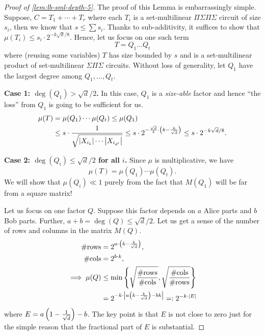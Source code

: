 \begin{proof}[Proof of \autoref{lem:lb-sml-depth-5}] The proof of this Lemma is embarrassingly simple. Suppose, $C = T_1 +  \cdots + T_r$ where each $T_i$ is a set-multilinear $\Pi\Sigma\Pi\Sigma$ circuit of size $s_i$, then we know that $s \leq \sum s_i$. Thanks to sub-additivity, it suffices to show that $\mu(T_i) \leq s_i \cdot 2^{-k\sqrt{d}/8}$. Hence, let us focus on one such term
  \[
    T = Q_1 \ldots Q_t
  \]
  where (reusing some variables) $T$ has size bounded by $s$ and is a set-multilinear product of set-multilinear $\Sigma\Pi\Sigma$ circuits. Without loss of generality, let $Q_1$ have the largest degree among $Q_1,\ldots, Q_t$.

  \medskip

  {\bf Case 1: $\deg(Q_1) > \sqrt{d}/2$.} In this case, $Q_1$ is a \emph{size-able} factor and hence ``the loss'' from $Q_1$ is going to be sufficient for us.
  \begin{align*}
    \mu(T) & = \mu(Q_1) \cdots \mu(Q_t) \leq \mu(Q_1)\\
           & \leq s \cdot \frac{1}{\sqrt{\left|X_{i_1}\right| \cdots \left|X_{i_{d'}}\right|}} \leq s \cdot 2^{-\frac{\sqrt{d}}{4} \cdot \left(k - \frac{k}{\sqrt{d}}\right)} \leq s \cdot 2^{-k\sqrt{d}/8}.
  \end{align*}

  \medskip

  {\bf Case 2: $\deg(Q_i) \leq \sqrt{d}/2$ for all $i$.} Since $\mu$ is multiplicative, we have
  \[
    \mu(T)  = \mu(Q_1) \cdots \mu(Q_t).
  \]
  We will show that $\mu(Q_i) \ll 1$ purely from the fact that $M(Q_1)$ will be far from a square matrix!

  Let us focus on one factor $Q$. Suppose this factor depends on $a$ Alice parts and $b$ Bob parts. Further, $a+b = \deg(Q) \leq \sqrt{d}/2$. Let us get a sense of the number of rows and columns in the matrix $M(Q)$.
  \begin{align*}
    \#\text{rows} & = 2^{a \cdot \left(k - \frac{k}{\sqrt{d}}\right)},\\
    \#\text{cols} & = 2^{b \cdot k},\\
    \implies \mu(Q) & \leq \min \left\{\sqrt{\frac{\#\text{rows}}{\#\text{cols}}}, \sqrt{\frac{\#\text{cols}}{\#\text{rows}}}\right\}\\
                  & = 2^{- k \cdot \left|a\left(k - \frac{k}{\sqrt{d}}\right) - bk\right|} =: 2^{-k \cdot \left|E\right|}
  \end{align*}
  where $E = a\left(1 - \frac{1}{\sqrt{d}}\right) - b$. The key point is that $E$ is not close to zero just for the simple reason that the fractional part of $E$ is substantial.


\end{proof}
